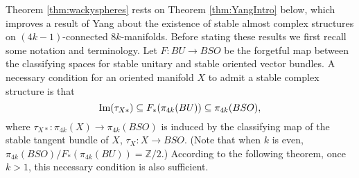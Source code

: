 \documentclass[12pt]{amsart}
\newcommand\Z{\mathbb{Z}}
\newcommand\im{\textup{Im}}
\theoremstyle{remark}
\begin{document}

Theorem \ref{thm:wackyspheres} rests on Theorem \ref{thm:YangIntro} below, which improves a result of Yang \cite{Yang12} 
about the existence of stable almost complex structures on $(4k{-}1)$-connected $8k$-manifolds.
Before stating these results we first recall some notation and terminology. Let $F \colon BU \to BSO$ be the forgetful map between the classifying spaces for stable unitary 
and stable oriented vector bundles.
A  necessary condition
for an oriented manifold $X$
to admit a stable complex structure
is that $$\im(\tau_{X*}) \subseteq F_*(\pi_{4k}(BU)) \subseteq \pi_{4k}(BSO),$$
where $\tau_{X*} \colon \pi_{4k}(X) \to \pi_{4k}(BSO)$ is induced by 
the classifying map of the stable tangent bundle of $X$, $\tau_X \colon X \to BSO$.
(Note that when $k$ is even, $\pi_{4k}(BSO)/F_*(\pi_{4k}(BU)) = \Z/2$.)
According to the following theorem, once $k>1$, this necessary condition is also
sufficient. 
\end{document}
